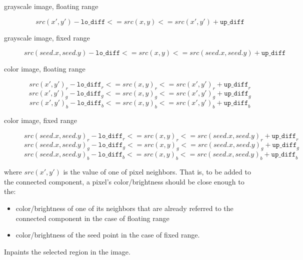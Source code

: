 \begin{description}

\item[grayscale image, floating range] \[
src(x',y')-\texttt{lo\_diff} <= src(x,y) <= src(x',y')+\texttt{up\_diff} \]

\item[grayscale image, fixed range] \[
src(seed.x,seed.y)-\texttt{lo\_diff}<=src(x,y)<=src(seed.x,seed.y)+\texttt{up\_diff} \]

\item[color image, floating range]
\[ src(x',y')_r-\texttt{lo\_diff}_r<=src(x,y)_r<=src(x',y')_r+\texttt{up\_diff}_r \]
\[ src(x',y')_g-\texttt{lo\_diff}_g<=src(x,y)_g<=src(x',y')_g+\texttt{up\_diff}_g \]
\[ src(x',y')_b-\texttt{lo\_diff}_b<=src(x,y)_b<=src(x',y')_b+\texttt{up\_diff}_b \]

\item[color image, fixed range]
\[ src(seed.x,seed.y)_r-\texttt{lo\_diff}_r<=src(x,y)_r<=src(seed.x,seed.y)_r+\texttt{up\_diff}_r \]
\[ src(seed.x,seed.y)_g-\texttt{lo\_diff}_g<=src(x,y)_g<=src(seed.x,seed.y)_g+\texttt{up\_diff}_g \]
\[ src(seed.x,seed.y)_b-\texttt{lo\_diff}_b<=src(x,y)_b<=src(seed.x,seed.y)_b+\texttt{up\_diff}_b \]
\end{description}

where $src(x',y')$ is the value of one of pixel neighbors. That is, to be added to the connected component, a pixel's color/brightness should be close enough to the:
\begin{itemize}
  \item color/brightness of one of its neighbors that are already referred to the connected component in the case of floating range
  \item color/brightness of the seed point in the case of fixed range.
\end{itemize}

Inpaints the selected region in the image.


\begin{description}
\end{description}

